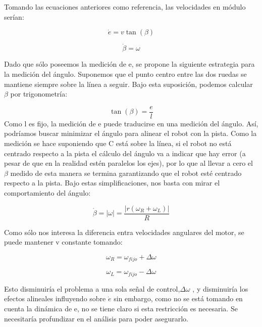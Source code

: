 \documentclass[10pt,conference,a4paper,onecolumn]{article}%
\begin{document}
Tomando las ecuaciones anteriores como referencia, las velocidades en módulo serían:

\begin{equation}
\dot{e}=v \tan(\beta)
\end{equation}

\begin{equation}
\dot{\beta}=\omega
\end{equation}

Dado que sólo poseemos la medición de e, se propone la siguiente estrategia para la medición del ángulo. Suponemos que el punto centro entre las dos ruedas se mantiene siempre sobre la línea a seguir. Bajo esta suposición, podemos calcular $\beta $ por trigonometría:

\begin{equation}
\tan(\beta)=\frac{e}{l}
\end{equation}
Como l es fijo, la medición de e puede traducirse en una medición del ángulo. Así, podríamos buscar minimizar el ángulo para alinear el robot con la pista. Como la medición se hace suponiendo que C está sobre la línea, si el robot no está centrado respecto a la pista el cálculo del ángulo va a indicar que hay error (a pesar de que en la realidad estén paralelos los ejes), por lo que al llevar a cero el $ \beta $ medido de esta manera se termina garantizando que el robot esté centrado respecto a la pista.
Bajo estas simplificaciones, nos basta con mirar el comportamiento del ángulo:

\begin{equation}
\dot{\beta}=\vert \omega \vert	=\frac{ \vert r(\omega _R + \omega _L) \vert }{R}
\end{equation}

Como sólo nos interesa la diferencia entra velocidades angulares del motor, se puede mantener v constante tomando:

\begin{equation}
\omega _R = \omega _{fijo} +\Delta \omega
\end{equation}

\begin{equation}
\omega _L = \omega _{fijo} -\Delta \omega
\end{equation}

Esto disminuiría el problema a una sola señal de control,$\Delta \omega$ , y disminuiría los efectos alineales influyendo sobre $\dot{e} $ sin embargo, como no se está tomando en cuenta la dinámica de e, no se tiene claro si esta restricción es necesaria. Se necesitaría profundizar en el análisis para poder asegurarlo.
\end{document}
